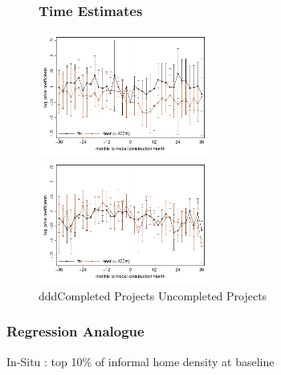 \documentclass[aspectratio=149]{beamer}
\begin{document}
\begin{frame}
\begin{figure}
\frametitle{Time Estimates}
\includegraphics[width=0.5\textwidth,trim={.77cm 0cm .21cm 0cm}]{timeplot.pdf}
   \hfill
\includegraphics[width=0.5\textwidth,trim={.77cm 0cm .21cm 0cm},clip]{timeplot_placebo.pdf}\\
{\color{white}ddd}Completed Projects \hspace{2.4cm} Uncompleted Projects
\end{figure}
\end{frame}


\begin{frame}
\frametitle{Regression Analogue}
\begin{center}

\end{center}
In-Situ : top 10\% of informal home density at baseline
\end{frame}


\end{document}
